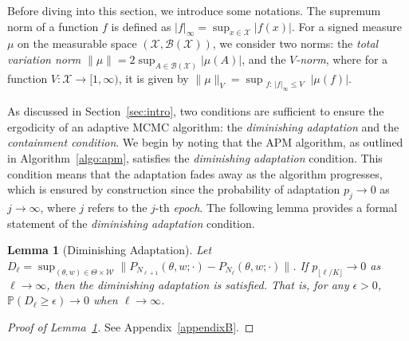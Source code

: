 \documentclass[pdflatex,sn-mathphys-num]{sn-jnl}
\newcommand{\Prob}{\mathbb{P}}
\renewcommand{\geq}{\geqslant}
\renewcommand{\leq}{\leqslant}
\theoremstyle{thmstyleone}
\newtheorem{lemma}{Lemma}
\theoremstyle{thmstyletwo}
\theoremstyle{thmstylethree}
\begin{document}
Before diving into this section, we introduce some notations. The supremum norm of a function \( f \) is defined as 
\( |f|_\infty = \sup_{x \in \mathcal{X}} |f(x)| \). For a signed measure \( \mu \) on the measurable space 
\( (\mathcal{X}, \mathcal{B}(\mathcal{X})) \), we consider two norms: the \emph{total variation norm} 
\( \|\mu\| = 2 \sup_{A \in \mathcal{B}(\mathcal{X})} |\mu(A)| \), and the \emph{\( V \)-norm}, where for a function 
\( V : \mathcal{X} \to [1, \infty) \), it is given by 
\( \|\mu\|_V = \sup_{\substack{f:\, |f|_\infty \leq V}} |\mu(f)| \).

As discussed in Section~\ref{sec:intro}, two conditions are sufficient to ensure the ergodicity of an adaptive MCMC algorithm: the \textit{diminishing adaptation} and the \textit{containment condition}. We begin by noting that the APM algorithm, as outlined in Algorithm~\ref{algo:apm}, satisfies the \textit{diminishing adaptation} condition. This condition means that the adaptation fades away as the algorithm progresses, which is ensured by construction since the probability of adaptation $p_j \to 0$ as $j \to \infty$, where $j$ refers to the $j$-th \textit{epoch}. The following lemma provides a formal statement of the \textit{diminishing adaptation} condition.

\begin{lemma}[Diminishing Adaptation] Let $D_\ell = \sup_{(\theta,w) \in \Theta \times \mathcal{W}} \| P_{N_{\ell+1}}(\theta, w; \cdot) - P_{N_\ell}(\theta, w; \cdot) \|$.
If $p_{\lfloor{\ell/K}\rfloor} \to 0$ as $\ell \to \infty$, then the \textit{diminishing adaptation} is satisfied. That is, for any \( \epsilon > 0 \), \(
\Prob(D_\ell \geq \epsilon) \to 0\) when $\ell \to \infty$.
\label{lemma1}
\end{lemma}
\begin{proof}[Proof of Lemma~{\upshape\ref{lemma1}}]
    See Appendix~\ref{appendixB}.
\end{proof}
\end{document}
